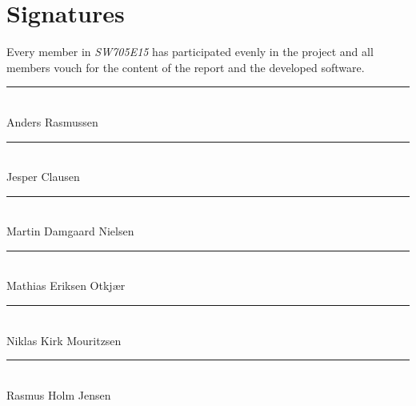 
\chapter*{Signatures}
Every member in \emph{SW705E15} has participated evenly in the project and all members vouch for the content of the report and the developed software.

\vspace{1cm}

\vspace*{\fill}

\noindent
\rule{9cm}{1pt}				\\
\vspace{1.5cm}
Anders Rasmussen			\\

\noindent
\rule{9cm}{1pt}				\\
\vspace{1.5cm}
Jesper Clausen	      		\\

\noindent
\rule{9cm}{1pt}				\\
\vspace{1.5cm}
Martin Damgaard Nielsen		\\

\noindent
\rule{9cm}{1pt}				\\
\vspace{1.5cm}
Mathias Eriksen Otkjær	    \\

\noindent
\rule{9cm}{1pt}				\\
\vspace{1.5cm}
Niklas Kirk Mouritzsen		\\

\noindent
\rule{9cm}{1pt}				\\
\vspace{1.5cm}
Rasmus Holm Jensen			\\

\vspace*{\fill}